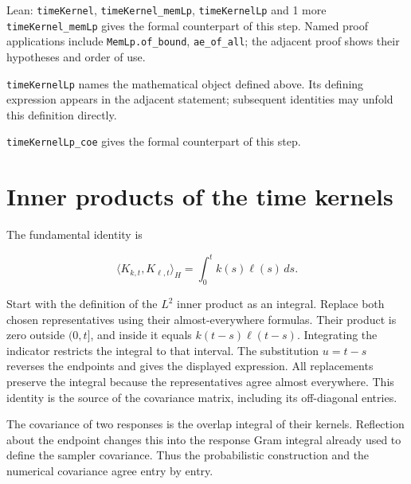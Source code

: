\documentclass[11pt,a4paper]{article}
\begin{document}
\begin{leanbox}{Lean: \texttt{timeKernel}, \texttt{timeKernel\_\allowbreak{}memLp}, \texttt{timeKernelLp} and 1 more}
\texttt{time\allowbreak{}Kernel\_\allowbreak{}mem\allowbreak{}Lp} gives the formal counterpart of this step. Named proof applications include \texttt{Mem\allowbreak{}Lp.\allowbreak{}of\_\allowbreak{}bound}, \texttt{ae\_\allowbreak{}of\_\allowbreak{}all}; the adjacent proof shows their hypotheses and order of use.




\texttt{time\allowbreak{}Kernel\allowbreak{}Lp} names the mathematical object defined above. Its defining expression appears in the adjacent statement; subsequent identities may unfold this definition directly.




\texttt{time\allowbreak{}Kernel\allowbreak{}Lp\_\allowbreak{}coe} gives the formal counterpart of this step.
\end{leanbox}

\section{\texorpdfstring{Inner products of the time kernels}{Inner products of the time kernels}}


The fundamental identity is

\[\langle K_{k,t},K_{\ell,t}\rangle_H=\int_0^t k(s)\ell(s)\,ds.\]

Start with the definition of the \(L^{2}\) inner product as an integral. Replace both chosen representatives using their almost-everywhere formulas. Their product is zero outside \((0,t]\), and inside it equals \(k(t-s)\ell(t-s)\). Integrating the indicator restricts the integral to that interval. The substitution \(u=t-s\) reverses the endpoints and gives the displayed expression. All replacements preserve the integral because the representatives agree almost everywhere. This identity is the source of the covariance matrix, including its off-diagonal entries.



The covariance of two responses is the overlap integral of their kernels. Reflection about the endpoint changes this into the response Gram integral already used to define the sampler covariance. Thus the probabilistic construction and the numerical covariance agree entry by entry.
\end{document}
